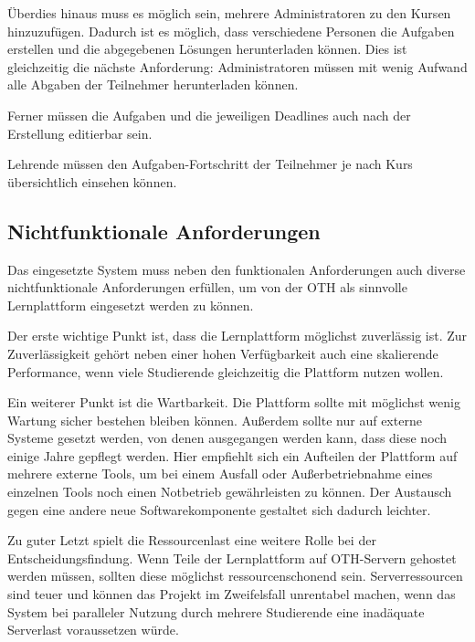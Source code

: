 Überdies hinaus muss es möglich sein, mehrere Administratoren zu den Kursen
hinzuzufügen. Dadurch ist es möglich, dass verschiedene Personen die Aufgaben
erstellen und die abgegebenen Lösungen herunterladen können. Dies ist
gleichzeitig die nächste Anforderung: Administratoren müssen mit wenig
Aufwand alle Abgaben der Teilnehmer herunterladen können.

Ferner müssen die Aufgaben und die jeweiligen Deadlines auch nach der Erstellung
editierbar sein.

Lehrende müssen den Aufgaben-Fortschritt der Teilnehmer je nach Kurs 
übersichtlich einsehen können.
\subsection{Nichtfunktionale Anforderungen}
\label{anforderungsanalyse-nichtfunktional}
Das eingesetzte System muss neben den funktionalen Anforderungen auch diverse
nichtfunktionale Anforderungen erfüllen, um von der OTH als sinnvolle
Lernplattform eingesetzt werden zu können.

Der erste wichtige Punkt ist, dass die Lernplattform möglichst zuverlässig ist.
Zur Zuverlässigkeit gehört neben einer hohen Verfügbarkeit auch eine skalierende
Performance, wenn viele Studierende gleichzeitig die Plattform nutzen wollen.

Ein weiterer Punkt ist die Wartbarkeit. Die Plattform sollte mit möglichst wenig
Wartung sicher bestehen bleiben können. Außerdem sollte nur auf externe Systeme
gesetzt werden, von denen ausgegangen werden kann, dass diese noch einige Jahre
gepflegt werden. Hier empfiehlt sich ein Aufteilen der Plattform auf mehrere
externe Tools, um bei einem Ausfall oder Außerbetriebnahme eines einzelnen Tools
noch einen Notbetrieb gewährleisten zu können. Der Austausch gegen eine andere
neue Softwarekomponente gestaltet sich dadurch leichter.

Zu guter Letzt spielt die Ressourcenlast eine weitere Rolle bei der
Entscheidungsfindung. Wenn Teile der Lernplattform auf OTH-Servern gehostet
werden müssen, sollten diese möglichst ressourcenschonend sein. Serverressourcen
sind teuer und können das Projekt im Zweifelsfall unrentabel machen, wenn das
System bei paralleler Nutzung durch mehrere Studierende eine inadäquate
Serverlast voraussetzen würde.